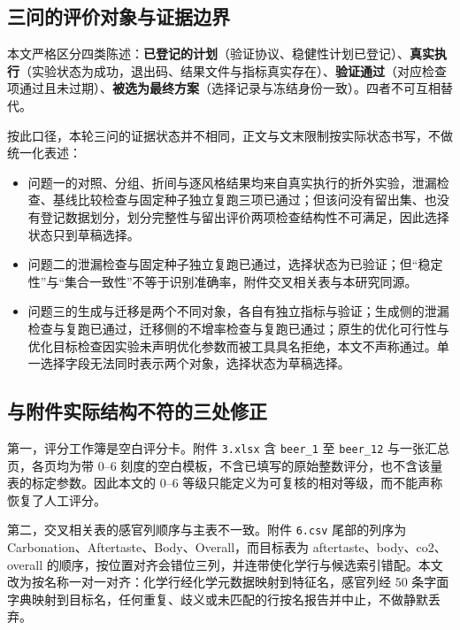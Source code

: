 \documentclass[11pt,a4paper]{article}
\providecommand{\tightlist}{%
  \setlength{\itemsep}{0pt}\setlength{\parskip}{0pt}}
\begin{document}
\subsection{三问的评价对象与证据边界}\label{ux4e09ux95eeux7684ux8bc4ux4ef7ux5bf9ux8c61ux4e0eux8bc1ux636eux8fb9ux754c}

本文严格区分四类陈述：\textbf{已登记的计划}（验证协议、稳健性计划已登记）、\textbf{真实执行}（实验状态为成功，退出码、结果文件与指标真实存在）、\textbf{验证通过}（对应检查项通过且未过期）、\textbf{被选为最终方案}（选择记录与冻结身份一致）。四者不可互相替代。

按此口径，本轮三问的证据状态并不相同，正文与文末限制按实际状态书写，不做统一化表述：

\begin{itemize}
\tightlist
\item
  问题一的对照、分组、折间与逐风格结果均来自真实执行的折外实验，泄漏检查、基线比较检查与固定种子独立复跑三项已通过；但该问没有留出集、也没有登记数据划分，划分完整性与留出评价两项检查结构性不可满足，因此选择状态只到草稿选择。
\item
  问题二的泄漏检查与固定种子独立复跑已通过，选择状态为已验证；但``稳定性''与``集合一致性''不等于识别准确率，附件交叉相关表与本研究同源。
\item
  问题三的生成与迁移是两个不同对象，各自有独立指标与验证；生成侧的泄漏检查与复跑已通过，迁移侧的不增率检查与复跑已通过；原生的优化可行性与优化目标检查因实验未声明优化参数而被工具具名拒绝，本文不声称通过。单一选择字段无法同时表示两个对象，选择状态为草稿选择。
\end{itemize}

\subsection{与附件实际结构不符的三处修正}\label{ux4e0eux9644ux4ef6ux5b9eux9645ux7ed3ux6784ux4e0dux7b26ux7684ux4e09ux5904ux4feeux6b63}

第一，评分工作簿是空白评分卡。附件 \texttt{3.xlsx} 含 \texttt{beer\_1}
至 \texttt{beer\_12} 与一张汇总页，各页均为带 0--6
刻度的空白模板，不含已填写的原始整数评分，也不含该量表的标定参数。因此本文的
0--6 等级只能定义为可复核的相对等级，而不能声称恢复了人工评分。

第二，交叉相关表的感官列顺序与主表不一致。附件 \texttt{6.csv}
尾部的列序为 Carbonation、Aftertaste、Body、Overall，而目标表为
aftertaste、body、co2、overall
的顺序，按位置对齐会错位三列，并连带使化学行与候选索引错配。本文改为按名称一对一对齐：化学行经化学元数据映射到特征名，感官列经
50
条字面字典映射到目标名，任何重复、歧义或未匹配的行按名报告并中止，不做静默丢弃。
\end{document}
